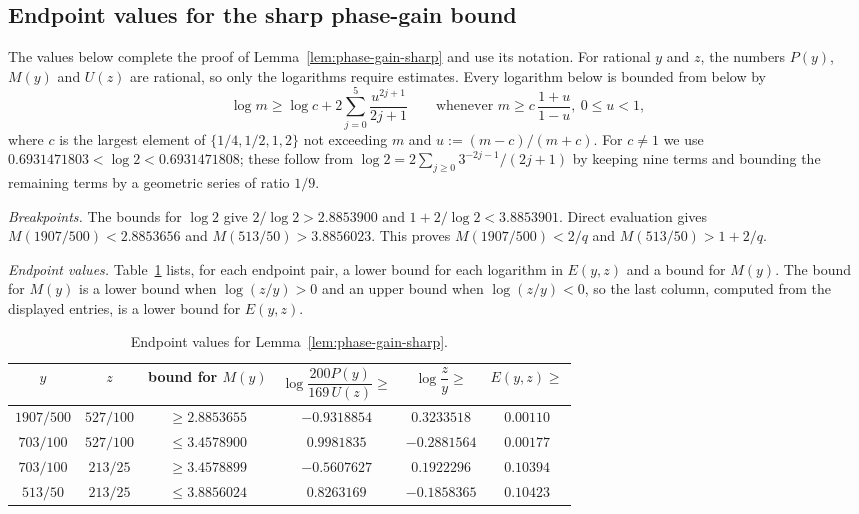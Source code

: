 \documentclass[a4paper,10pt,reqno]{amsart}
\numberwithin{equation}{section}
\theoremstyle{plain}
\theoremstyle{remark}
\begin{document}
\subsection{Endpoint values for the sharp phase-gain bound}
\label{app:phase-gain-sharp-endpoints}

The values below complete the proof of Lemma~\ref{lem:phase-gain-sharp}
and use its notation. For rational \(y\) and \(z\), the numbers \(P(y)\),
\(M(y)\) and \(U(z)\) are rational, so only the logarithms require
estimates. Every logarithm below is bounded from below by
\[
 \log m\ge\log c+2\sum_{j=0}^{5}\frac{u^{2j+1}}{2j+1}
 \qquad\text{whenever } m\ge c\,\frac{1+u}{1-u},\ 0\le u<1,
\]
where \(c\) is the largest element of \(\{1/4,1/2,1,2\}\) not exceeding
\(m\) and \(u:=(m-c)/(m+c)\). For \(c\ne1\) we use
\(0.6931471803<\log 2<0.6931471808\); these follow from
\(\log 2=2\sum_{j\ge0}3^{-2j-1}/(2j+1)\) by keeping nine terms and bounding
the remaining terms by a geometric series of ratio \(1/9\).

\emph{Breakpoints.} The bounds for \(\log 2\) give
\(2/\log 2>2.8853900\) and \(1+2/\log 2<3.8853901\). Direct evaluation gives
\(M(1907/500)<2.8853656\) and \(M(513/50)>3.8856023\). This proves
\(M(1907/500)<2/q\) and \(M(513/50)>1+2/q\).

\emph{Endpoint values.} Table~\ref{tab:phase-gain-sharp-endpoints} lists,
for each endpoint pair, a lower bound for each logarithm in \(E(y,z)\) and a
bound for \(M(y)\). The bound for \(M(y)\) is a lower bound when
\(\log(z/y)>0\) and an upper bound when \(\log(z/y)<0\), so the last column,
computed from the displayed entries, is a lower bound for \(E(y,z)\).

\begin{table}[ht]
\centering
\caption{Endpoint values for Lemma~\ref{lem:phase-gain-sharp}.}
\label{tab:phase-gain-sharp-endpoints}
\small
\begin{tabular}{cccccc}
\(y\) & \(z\) & bound for \(M(y)\) &
\(\log\dfrac{200P(y)}{169\,U(z)}\ge\) & \(\log\dfrac zy\ge\) &
\(E(y,z)\ge\)\\[4pt]
\hline
\(1907/500\) & \(527/100\) & \(\ge2.8853655\) & \(-0.9318854\) & \(0.3233518\) & \(0.00110\)\\
\(703/100\) & \(527/100\) & \(\le3.4578900\) & \(0.9981835\) & \(-0.2881564\) & \(0.00177\)\\
\(703/100\) & \(213/25\) & \(\ge3.4578899\) & \(-0.5607627\) & \(0.1922296\) & \(0.10394\)\\
\(513/50\) & \(213/25\) & \(\le3.8856024\) & \(0.8263169\) & \(-0.1858365\) & \(0.10423\)
\end{tabular}
\end{table}
\end{document}
